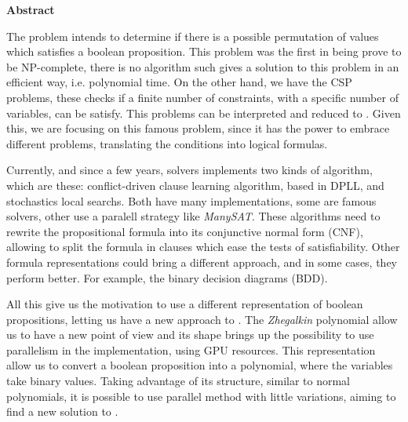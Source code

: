 \cleardoublepage
{}
{}
\thispagestyle{pagebottom}
\noindent\textbf{\Huge Abstract}

\vspace{2em}

The \sat problem intends to determine if there is a possible permutation of values which satisfies a boolean proposition. This problem was the first in being prove to be NP-complete, there is no algorithm such gives a solution to this problem in an efficient way, i.e. polynomial time. On the other hand, we have the CSP problems, these checks if a finite number of constraints, with a specific number of variables, can be satisfy. This problems can be interpreted and reduced to \sat. Given this, we are focusing on this famous problem, since it has the power to embrace different problems, translating the conditions into logical formulas.

Currently, and since a few years, \sat solvers implements two kinds of algorithm, which are these: conflict-driven clause learning algorithm, based in DPLL, and stochastics local searchs. Both have many implementations, some are famous \sat solvers, other use a paralell strategy like \textit{ManySAT}. These algorithms need to rewrite the propositional formula into its conjunctive normal form (CNF), allowing to split the formula in clauses which ease the tests of satisfiability. Other formula representations could bring a different approach, and in some cases, they perform better. For example, the binary decision diagrams (BDD).

All this give us the motivation to use a different representation of boolean propositions, letting us have a new approach to \sat. The \textit{Zhegalkin} polynomial allow us to have a new point of view and its shape brings up the possibility to use parallelism in the implementation, using GPU resources. This representation allow us to convert a boolean proposition into a polynomial, where the variables take binary values. Taking advantage of its structure, similar to normal polynomials, it is possible to use parallel method with little variations, aiming to find a new solution to \sat.

\newpage